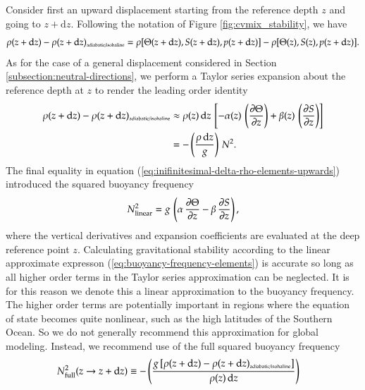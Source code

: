 Consider first an upward displacement starting from the reference
depth $z$ and going to $z+\mathrm{d}z$.  Following the notation of
Figure \ref{fig:cvmix_stability}, we have
\begin{equation}
\rho(z+\mathrm{d} z)  - \rho(z+\mathrm{d} z)_{\mbox{\tiny adiabatic/isohaline}}  
= 
 \rho[ \Theta(z + \mathrm{d} z), S(z + \mathrm{d} z), p(z + \mathrm{d} z)]
-
\rho[ \Theta(z), S(z), p(z + \mathrm{d}z)].
\end{equation}
As for the case of a general displacement considered in Section
\ref{subsection:neutral-directions}, we perform a Taylor series
expansion about the reference depth at $z$ to render the leading order
identity
\begin{equation}
\begin{split}
\rho(z+\mathrm{d} z)  - \rho(z+\mathrm{d} z)_{\mbox{\tiny adiabatic/isohaline}}  
&\approx 
  \rho(z) \, \mathrm{d}z \, \left[ 
   -\alpha(z) \, \left( \frac{\partial \Theta}{\partial z} \right )
 + \beta(z) \, \left( \frac{\partial S}{\partial z} \right) \right]
 \\
&= 
 -\left( \frac{\rho \, \mathrm{d}z}{g} \right) \, N^{2}.
\end{split}
\label{eq:inifinitesimal-delta-rho-elements-upwards}
\end{equation}
The final equality in equation
(\ref{eq:inifinitesimal-delta-rho-elements-upwards}) introduced the
squared buoyancy frequency
 \begin{equation}
 N^{2}_{\mbox{\scriptsize linear}} = g \, \left( \alpha \, \frac{\partial \Theta}{\partial z} 
                         - \beta  \, \frac{\partial S}{\partial z} \right),
\label{eq:buoyancy-frequency-elements}
\end{equation}
where the vertical derivatives and expansion coefficients are
evaluated at the deep reference point $z$.  Calculating gravitational
stability according to the linear approximate expresson
(\ref{eq:buoyancy-frequency-elements}) is accurate so long as all
higher order terms in the Taylor series approximation can be
neglected.  It is for this reason we denote this a linear
approximation to the buoyancy frequency.  The higher order terms are
potentially important in regions where the equation of state becomes
quite nonlinear, such as the high latitudes of the Southern Ocean.  So
we do not generally recommend this approximation for global modeling.
Instead, we recommend use of the full squared buoyancy frequency
\begin{equation}
\begin{split}
 N^{2}_{\mbox{\scriptsize full}}(z \rightarrow z+\mathrm{d}z) &\equiv 
 -\left( \frac{g \, [ \rho(z+\mathrm{d} z)  - \rho(z+\mathrm{d} z)_{\mbox{\tiny adiabatic/isohaline}} ] } {\rho(z) \, \mathrm{d}z} \right)
\end{split}
\label{eq:inifinitesimal-delta-rho-elements-upwards}
\end{equation}

